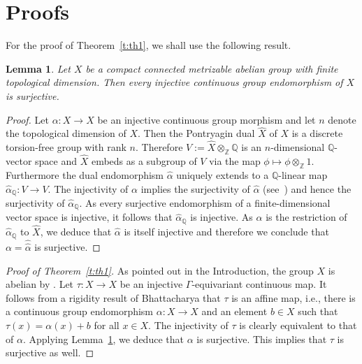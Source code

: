 \documentclass[12pt,a4paper]{amsart}
\newtheorem{lemma}[theorem]{Lemma}
\theoremstyle{definition}
\numberwithin{equation}{section}
\begin{document}
\section{Proofs}

For the proof of Theorem~\ref{t:th1}, we shall use the following result.

\begin{lemma}
\label{l:inj-endo-surj}
Let $X$ be a compact connected metrizable abelian group with finite topological dimension.
Then every injective continuous group endomorphism of $X$ is surjective.
\end{lemma}

\begin{proof}
Let $\alpha \colon X \to X$ be an injective continuous group morphism and let $n$ denote the topological dimension of $X$.
Then the Pontryagin dual $\widehat{X}$ of $X$ is a discrete torsion-free group with rank $n$.
Therefore $V := \widehat{X} \otimes_{\mathbb{Z}} {\mathbb{Q}}$ is an $n$-dimensional ${\mathbb{Q}}$-vector space and
$\widehat{X}$ embeds as a subgroup of $V$ via the map $\phi \mapsto  \phi \otimes_{\mathbb{Z}} 1$.
Furthermore the dual endomorphism $\widehat{\alpha}$ uniquely extends to a ${\mathbb{Q}}$-linear map 
$\widehat{\alpha}_{\mathbb{Q}} \colon V \to V$.
The injectivity of $\alpha$ implies the
surjectivity of $\widehat{\alpha}$
(see~\cite[Proposition~30]{morris}) 
and hence the surjectivity of $\widehat{\alpha}_{\mathbb{Q}}$.
As every surjective endomorphism of a finite-dimensional vector space is injective,  it follows that
$\widehat{\alpha}_{\mathbb{Q}}$ is injective.
As $\widehat{\alpha}$ is the restriction of $\widehat{\alpha}_{\mathbb{Q}}$ to $\widehat{X}$, we deduce that 
$\widehat{\alpha}$ is itself injective and therefore we conclude that
$\alpha = \widehat{\widehat{\alpha}}$ is surjective.
  \end{proof}
  
\begin{proof}[Proof of Theorem~\ref{t:th1}]
As pointed out in the Introduction, the group $X$ is abelian by \cite[Theorem~3.2]{lam}.
Let $\tau \colon X \to X$ be an injective   $\Gamma$-equivariant continuous map.
It follows from  a rigidity result of Bhattacharya \cite[Corollary~1]{bhattacharya}  that $\tau$ is an affine map, i.e., there is a continuous group endomorphism
$\alpha  \colon X \to X$ and an element $b \in X$ such that
$\tau(x) = \alpha(x) + b$ for all $x \in X$.
The injectivity of $\tau$ is clearly equivalent to   that of $\alpha$.
Applying Lemma~\ref{l:inj-endo-surj}, we deduce that $\alpha$ is surjective.
This  implies that $\tau$ is surjective as well. 
\end{proof}
\end{document}
